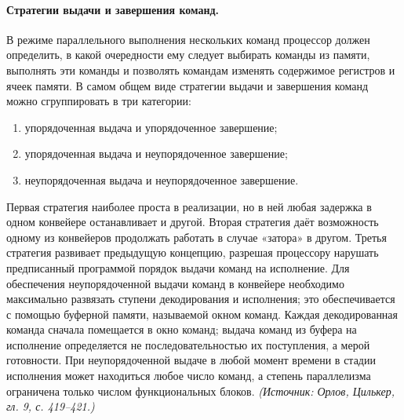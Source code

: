 \documentclass[a4paper,12pt]{article}
\begin{document}
\paragraph{Стратегии выдачи и завершения команд.}
В режиме параллельного выполнения нескольких команд процессор должен определить, в какой очередности ему следует выбирать команды из памяти, выполнять эти команды и позволять командам изменять содержимое регистров и ячеек памяти. В самом общем виде стратегии выдачи и завершения команд можно сгруппировать в три категории:
\begin{enumerate}[label=\arabic*)]
\item упорядоченная выдача и упорядоченное завершение;
\item упорядоченная выдача и неупорядоченное завершение;
\item неупорядоченная выдача и неупорядоченное завершение.
\end{enumerate}
Первая стратегия наиболее проста в реализации, но в ней любая задержка в одном конвейере останавливает и другой. Вторая стратегия даёт возможность одному из конвейеров продолжать работать в случае «затора» в другом. Третья стратегия развивает предыдущую концепцию, разрешая процессору нарушать предписанный программой порядок выдачи команд на исполнение. Для обеспечения неупорядоченной выдачи команд в конвейере необходимо максимально развязать ступени декодирования и исполнения; это обеспечивается с помощью буферной памяти, называемой окном команд. Каждая декодированная команда сначала помещается в окно команд; выдача команд из буфера на исполнение определяется не последовательностью их поступления, а мерой готовности. При неупорядоченной выдаче в любой момент времени в стадии исполнения может находиться любое число команд, а степень параллелизма ограничена только числом функциональных блоков.
\textit{(Источник: Орлов, Цилькер, гл. 9, с. 419--421.)}
\end{document}
